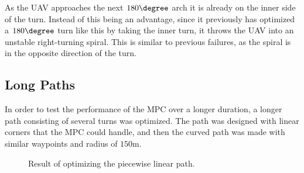 As the UAV approaches the next $180\degree$ arch it is already on the inner side of the turn. Instead of this being an advantage, since it previously has optimized a $180\degree$ turn like this by taking the inner turn, it throws the UAV into an unstable right-turning spiral. This is similar to previous failures, as the spiral is in the opposite direction of the turn.


\subsection{Long Paths}
\label{subsec:long_paths}

In order to test the performance of the MPC over a longer duration, a longer path consisting of several turns was optimized. The path was designed with linear corners that the MPC could handle, and then the curved path was made with similar waypoints and radius of $150$m.

\begin{figure}
	\caption{Result of optimizing the piecewise linear path.}
	\label{fig:path_lin_easy}
\end{figure}

